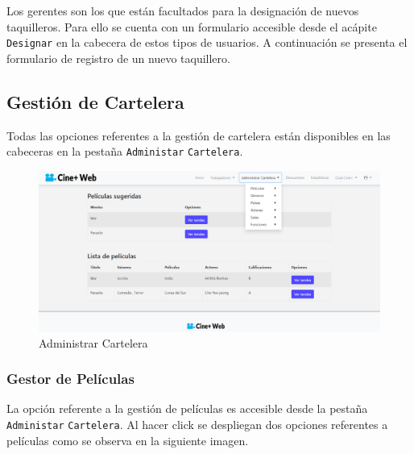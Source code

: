 Los gerentes son los que est\'an facultados para la designación de nuevos taquilleros. Para ello se cuenta con un formulario accesible desde el acápite \verb|Designar| en la cabecera de estos tipos de usuarios. A continuación se presenta el formulario de registro de un nuevo taquillero.\\

\subsection{Gestión de Cartelera}

Todas las opciones referentes a la gestión de cartelera est\'an disponibles en las cabeceras en la pesta\~na \verb*|Administar| \verb*|Cartelera|.\\

\begin{figure}[h!]
	\centering
	\includegraphics[scale=0.35]{./chapters/img/cartelera.png}
	
	\label{fig:cartelera}
	\caption{Administrar Cartelera}
	
\end{figure}

\subsubsection{Gestor de Pel\'iculas}
La opci\'on referente a la gesti\'on de pel\'iculas es accesible desde la pesta\~na \verb*|Administar| \verb*|Cartelera|. Al hacer click se despliegan dos opciones referentes a pel\'iculas como se observa en la siguiente imagen.

